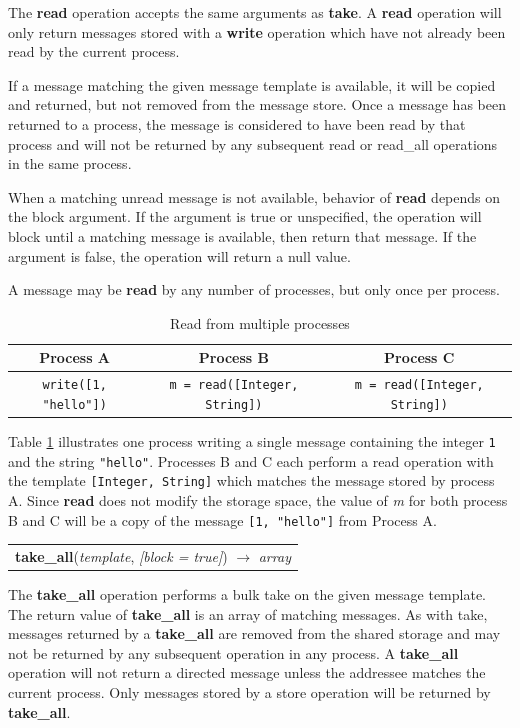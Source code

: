 \documentclass[lnicst]{svmultln}
\begin{document}
    The \textbf{read} operation accepts the same arguments as \textbf{take}. A \textbf{read} operation will only return messages stored with a \textbf{write} operation which have not already been read by the current process.

If a message matching the given message template is available, it will be copied and returned, but not removed from the message store. Once a message has been returned to a process, the message is considered to have been read by that process and will not be returned by any subsequent read or read\_all operations in the same process.

When a matching unread message is not available, behavior of \textbf{read} depends on the block argument. If the argument is true or unspecified, the operation will block until a matching message is available, then return that message. If the argument is false, the operation will return a null value.

A message may be \textbf{read} by any number of processes, but only once per process.

\begin{table}
\centering
\caption{Read from multiple processes}
\begin{tabular}{|c|c|c|} \hline
\textbf{Process A} & \textbf{Process B} & \textbf{Process C} \\ \hline
\texttt{write([1, "hello"])} & \texttt{m = read([Integer, String])} & \texttt{m = read([Integer, String])} \\ \hline
\end{tabular}
\label{fig:readprocesses}
\end{table}

    Table \ref{fig:readprocesses} illustrates one process writing a single message containing the integer \texttt{1} and the string \texttt{"hello"}. Processes B and C each perform a read operation with the template \texttt{[Integer, String]} which matches the message stored by process A. Since \textbf{read} does not modify the storage space, the value of \textit{m} for both process B and C will be a copy of the message \texttt{[1, "hello"]} from Process A.

\begin{table}
\begin{tabular}{c}
\textbf{take\_all}(\textit{template}, \textit{[block = true]}) $\rightarrow$ \textit{array}
\end{tabular}
\end{table}

    The \textbf{take\_all} operation performs a bulk take on the given message template. The return value of \textbf{take\_all} is an array of matching messages. As with take, messages returned by a \textbf{take\_all} are removed from the shared storage and may not be returned by any subsequent operation in any process. A \textbf{take\_all} operation will not return a directed message unless the addressee matches the current process. Only messages stored by a store operation will be returned by \textbf{take\_all}.
\end{document}
